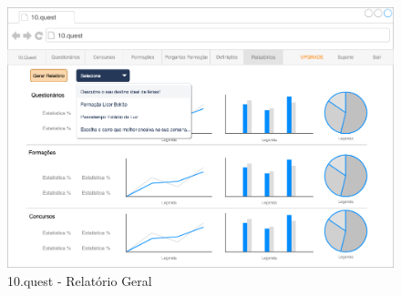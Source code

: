 \begin{figure}[ht!]
	\begin{center}
		\includegraphics[width=1\textwidth]{img/prototipos/relatorios.png}
		\caption{10.quest - Relatório Geral}
		\label{10q-rel}
	\end{center}
\end{figure}

